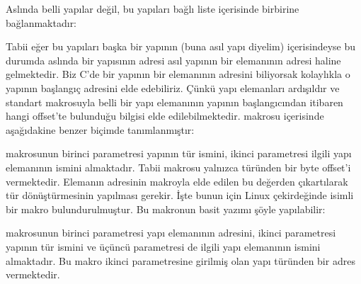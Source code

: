 \documentclass[a4paper,10pt,turkish]{sphinxmanual}
\begin{document}
\sphinxAtStartPar
Aslında belli yapılar değil, bu  yapıları bağlı liste içerisinde birbirine bağlanmaktadır:


\sphinxAtStartPar
Tabii eğer bu  yapıları başka bir yapının (buna asıl yapı diyelim) içerisindeyse bu durumda
aslında bir  yapısının adresi asıl yapının bir elemanının adresi haline gelmektedir. Biz C’de
bir yapının bir elemanının adresini biliyorsak kolaylıkla o yapının başlangıç adresini elde edebiliriz.
Çünkü yapı elemanları ardışıldır ve standart  makrosuyla belli bir yapı elemanının yapının
başlangıcından itibaren hangi offset’te bulunduğu bilgisi elde edilebilmektedir.  makrosu
 içerisinde aşağıdakine benzer biçimde tanımlanmıştır:

\begin{sphinxVerbatim}[commandchars=\\\{\}]
\end{sphinxVerbatim}

\sphinxAtStartPar
{} makrosunun birinci parametresi yapının tür ismini, ikinci parametresi ilgili yapı elemanının
ismini almaktadır. Tabii  makrosu yalnızca  türünden bir byte offset’i vermektedir.
Elemanın adresinin makroyla elde edilen bu değerden çıkartılarak tür dönüştürmesinin yapılması gerekir.
İşte bunun için Linux çekirdeğinde  isimli bir makro bulundurulmuştur. Bu makronun basit
yazımı şöyle yapılabilir:

\begin{sphinxVerbatim}[commandchars=\\\{\}]
\end{sphinxVerbatim}

\sphinxAtStartPar
{} makrosunun birinci parametresi yapı elemanının adresini, ikinci parametresi yapının tür
ismini ve üçüncü parametresi de ilgili yapı elemanının ismini almaktadır. Bu makro ikinci parametresine
girilmiş olan yapı türünden bir adres vermektedir.
\end{document}
